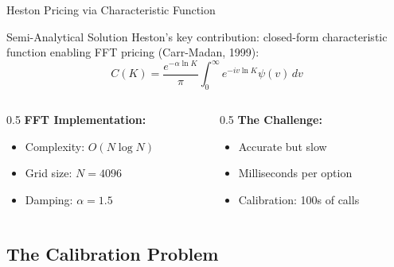 \documentclass{beamer}
\begin{document}
\begin{frame}{Heston Pricing via Characteristic Function}
    \begin{block}{Semi-Analytical Solution}
        Heston's key contribution: closed-form characteristic function enabling FFT pricing (Carr-Madan, 1999):
        \begin{equation}
            C(K) = \frac{e^{-\alpha \ln K}}{\pi} \int_0^\infty e^{-iv \ln K} \psi(v) \, dv
        \end{equation}
    \end{block}

    \vspace{0.3cm}

    \begin{columns}
        \begin{column}{0.5\textwidth}
            \textbf{FFT Implementation:}
            \begin{itemize}
                \item Complexity: $O(N \log N)$
                \item Grid size: $N = 4096$
                \item Damping: $\alpha = 1.5$
            \end{itemize}
        \end{column}
        \begin{column}{0.5\textwidth}
            \textbf{The Challenge:}
            \begin{itemize}
                \item Accurate but slow
                \item Milliseconds per option
                \item Calibration: 100s of calls
            \end{itemize}
        \end{column}
    \end{columns}
\end{frame}

\subsection{The Calibration Problem}
\end{document}
